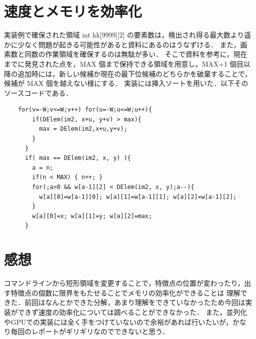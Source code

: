 \documentclass[11pt]{jarticle}
\begin{document}
\section{速度とメモリを効率化}
実装例で確保された領域 int kk[9999][2] の要素数は，検出され得る最大数より遥かに少なく問題が起きる可能性があると資料にあるのはうなずける．
また，画素数と同数の作業領域を確保するのは無駄が多い．
そこで資料を参考に，現在までに発見された点を，MAX 個まで保持できる領域を用意し，MAX+1 個目以降の追加時には，新しい候補か現在の最下位候補のどちらかを破棄することで，候補が MAX 個を越えない様にする．
実装には挿入ソートを用いた．以下そのソースコードである．

\begin{verbatim}
    for(v=-W;v<=W;v++) for(u=-W;u<=W;u++){
        if(DElem(im2, x+u, y+v) > max){
          max = DElem(im2,x+u,y+v);
        }
      }
      if( max == DElem(im2, x, y) ){
        a = n;
        if(n < MAX) { n++; }
        for(;a>0 && w[a-1][2] < DElem(im2, x, y);a--){
          w[a][0]=w[a-1][0]; w[a][1]=w[a-1][1]; w[a][2]=w[a-1][2];
        }
        w[a][0]=x; w[a][1]=y; w[a][2]=max;
      }
\end{verbatim}

\section{感想}

コマンドラインから短形領域を変更することで，特徴点の位置が変わったり，出す特徴点の個数に限界をもたせることでメモリの効率化ができることは
理解できた．前回はなんとかできた分解，あまり理解をできていなかったため今回は実装ができず速度の効率化については調べることができなかった．
また，並列化やGPUでの実装には全く手をつけていないので余裕があれば行いたいが，かなり毎回のレポートがギリギリなのでできないと思う．
\end{document}
